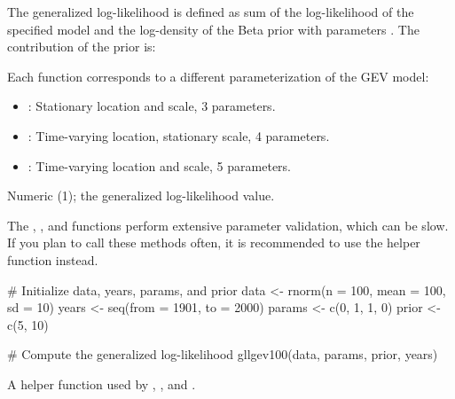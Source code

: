 \documentclass[a4paper]{book}
\begin{document}
\begin{Details}
The generalized log-likelihood is defined as sum of the log-likelihood of the specified
model and the log-density of the Beta prior with parameters . The contribution
of the prior is: 

Each function corresponds to a different parameterization of the GEV model:
\begin{itemize}

\item{} : Stationary location and scale, 3 parameters.
\item{} : Time-varying location, stationary scale, 4 parameters.
\item{} : Time-varying location and scale, 5 parameters.

\end{itemize}

\end{Details}
%
\begin{Value}
Numeric (1); the generalized log-likelihood value.
\end{Value}
%
\begin{Note}
The , , and  functions perform extensive parameter validation,
which can be slow. If you plan to call these methods often, it is recommended to use
the  helper function instead.
\end{Note}
%
\begin{SeeAlso}
\end{SeeAlso}
%
\begin{Examples}
\begin{ExampleCode}
# Initialize data, years, params, and prior
data <- rnorm(n = 100, mean = 100, sd = 10)
years <- seq(from = 1901, to = 2000)
params <- c(0, 1, 1, 0)
prior <- c(5, 10)

# Compute the generalized log-likelihood
gllgev100(data, params, prior, years)

\end{ExampleCode}
\end{Examples}
%
\begin{Description}
A helper function used by , , and .
\end{Description}
\end{document}
